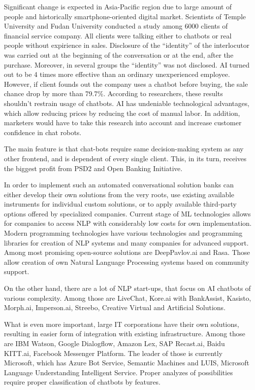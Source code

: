 Significant change is expected in Asia-Pacific region due to large amount of people and historically smartphone-oriented digital market.
Scientists of Temple University and Fudan University conducted a study among 6000 clients of financial service company.
All clients were talking either to chatbots or real people without expirience in sales.
Disclosure of the “identity” of the interlocutor was carried out at the beginning of the conversation or at the end, 
after the purchase.
Moreover, in several groups the “identity” was not disclosed.
AI turned out to be 4 times more effective than an ordinary unexperienced employee. 
However, if client founds out the company uses a chatbot before buying, the sale chance drop by more than 79.7\%. 
According to researchers, these results shouldn't restrain usage of chatbots.
AI has undeniable technological advantages, which allow reducing prices by reducing the cost of manual labor.
In addition, marketers would have to take this research into account and increase customer confidence in chat robots. 

The main feature is that chat-bots require same decision-making system as any other frontend, and is dependent of every single client.
This, in its turn, receives the biggest profit from PSD2 and Open Banking Initiative.

In order to implement such an automated conversational solution banks can either develop their own solutions from the very roots, use existing available instruments for individual custom solutions, or to apply available third-party options offered by specialized companies.
Current stage of ML technologies allows for companies to access NLP with considerably low costs for own implementation.
Modern programming technologies have various technologies and programming libraries for creation of NLP systems and many companies for advanced support.
Among most promising open-source solutions are DeepPavlov.ai and Rasa.
Those allow creation of own Natural Language Processing systems based on community support.

On the other hand, there are a lot of NLP start-ups, that focus on AI chatbots of various complexity.
Among those are LiveChat, Kore.ai with BankAssist, Kasisto, Morph.ai, Imperson.ai, Streebo, Creative Virtual and Artificial Solutions.

What is even more important, large IT corporations have their own solutions, resulting in easier form of integration with existing infrastructure.
Among those are IBM Watson, Google Dialogflow, Amazon Lex, SAP Recast.ai, Baidu KITT.ai, Facebook Messenger Platform.
The leader of those is currently Microsoft, which has Azure Bot Service, Semantic Machines and LUIS, Microsoft Language Understanding Intelligent Service.
Proper analyzes of possibilities require proper classification of chatbots by features.

